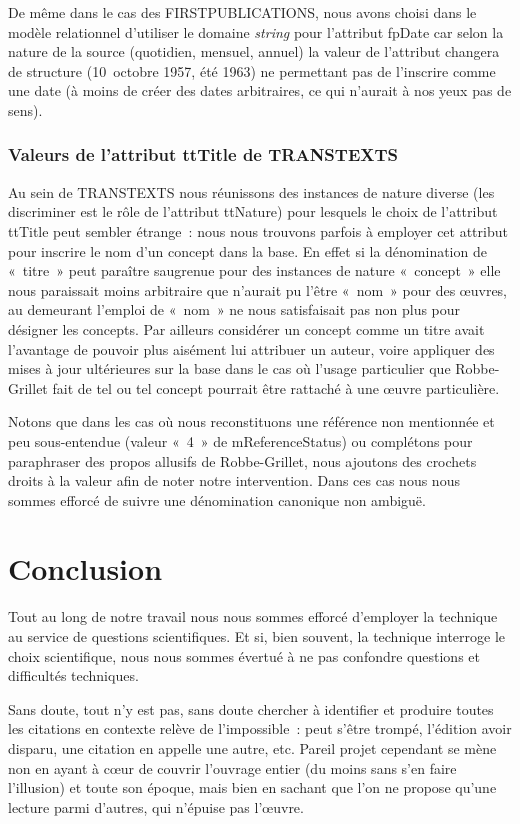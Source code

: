 De même dans le cas des FIRSTPUBLICATIONS, nous avons choisi dans le modèle relationnel d'utiliser le domaine \textit{string} pour l'attribut fpDate car selon la nature de la source (quotidien, mensuel, annuel) la valeur de l'attribut changera de structure (10~octobre 1957, été 1963) ne permettant pas de l'inscrire comme une date (à moins de créer des dates arbitraires, ce qui n'aurait à nos yeux pas de sens).


\subsubsection{Valeurs de l'attribut ttTitle de TRANSTEXTS}

Au sein de TRANSTEXTS nous réunissons des instances de nature diverse (les discriminer est le rôle de l'attribut ttNature) pour lesquels le choix de l'attribut ttTitle peut sembler étrange~: nous nous trouvons parfois à employer cet attribut pour inscrire le nom d'un concept dans la base. En effet si la dénomination de «~titre~» peut paraître saugrenue pour des instances de nature «~concept~» elle nous paraissait moins arbitraire que n'aurait pu l'être «~nom~» pour des œuvres, au demeurant l'emploi de «~nom~» ne nous satisfaisait pas non plus pour désigner les concepts. Par ailleurs considérer un concept comme un titre avait l'avantage de pouvoir plus aisément lui attribuer un auteur, voire appliquer des mises à jour ultérieures sur la base dans le cas où l'usage particulier que Robbe-Grillet fait de tel ou tel concept pourrait être rattaché à une œuvre particulière.

Notons que dans les cas où nous reconstituons une référence non mentionnée et peu sous-entendue (valeur «~4~» de mReferenceStatus) ou complétons pour paraphraser des propos allusifs de Robbe-Grillet, nous ajoutons des crochets droits à la valeur afin de noter notre intervention. Dans ces cas nous nous sommes efforcé de suivre une dénomination canonique non ambiguë.



\section{Conclusion}

Tout au long de notre travail nous nous sommes efforcé d'employer la technique au service de questions scientifiques. Et si, bien souvent, la technique interroge le choix scientifique, nous nous sommes évertué à ne pas confondre questions et difficultés techniques. 

Sans doute, tout n'y est pas, sans doute chercher à identifier et produire toutes les citations en contexte relève de l'impossible~: \robbe{} peut s'être trompé, l'édition avoir disparu, une citation en appelle une autre, etc. Pareil projet cependant se mène non en ayant à cœur de couvrir l'ouvrage entier (du moins sans s'en faire l'illusion) et toute son époque, mais bien en sachant que l'on ne propose qu'une lecture parmi d'autres, qui n'épuise pas l'œuvre.
